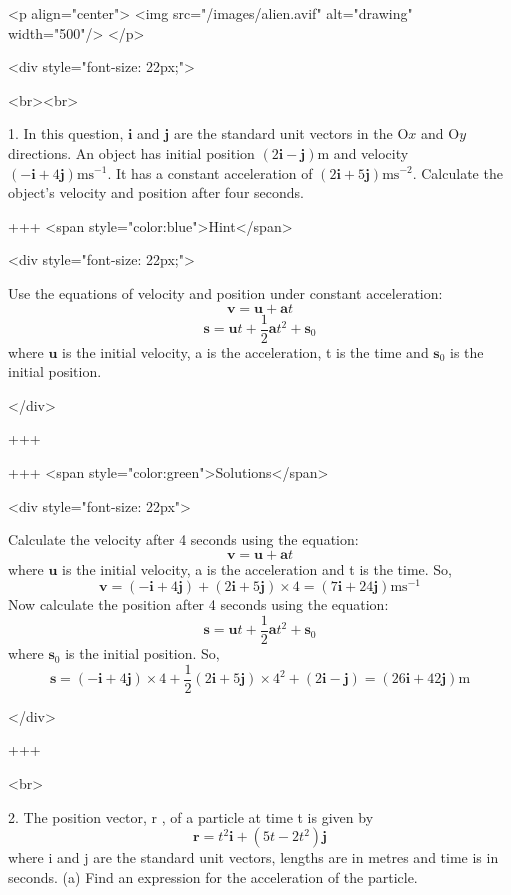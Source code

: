 <p align="center">
<img src="/images/alien.avif" alt="drawing" width="500"/>
</p>

<div style="font-size: 22px;">

<br><br>

1. In this question, $\mathbf{i}$ and $\mathbf{j}$ are the standard unit vectors in the $\mathrm{O} x$ and $\mathrm{O} y$ directions. An object has initial position $(2 \mathbf{i}-\mathbf{j}) \mathrm{m}$ and velocity $(-\mathbf{i}+4 \mathbf{j}) \mathrm{ms}^{-1}$. It has a constant acceleration of $(2 \mathbf{i}+5 \mathbf{j}) \mathrm{ms}^{-2}$.
Calculate the object's velocity and position after four seconds.

+++ <span style="color:blue">Hint</span>

<div style="font-size: 22px;">

Use the equations of velocity and position under constant acceleration:
$$\mathbf{v}=\mathbf{u}+\mathbf{a} t$$
$$\mathbf{s}=\mathbf{u} t+\frac{1}{2} \mathbf{a} t^{2}+\mathbf{s}_{0}$$
where $\mathbf{u}$ is the initial velocity, a is the acceleration, t is the time and $\mathbf{s}_{0}$ is the initial position.

</div>

+++

+++ <span style="color:green">Solutions</span>

<div style="font-size: 22px">

Calculate the velocity after 4 seconds using the equation:
$$\mathbf{v}=\mathbf{u}+\mathbf{a} t$$
where $\mathbf{u}$ is the initial velocity, a is the acceleration and t is the time.
So,
\[\mathbf{v}=(-\mathbf{i}+4 \mathbf{j})+(2 \mathbf{i}+5 \mathbf{j}) \times 4=(7 \mathbf{i}+24 \mathbf{j}) \mathrm{ms}^{-1}\]
Now calculate the position after 4 seconds using the equation:
$$\mathbf{s}=\mathbf{u} t+\frac{1}{2} \mathbf{a} t^{2}+\mathbf{s}_{0}$$
where $\mathbf{s}_{0}$ is the initial position.
So,
\[\mathbf{s}=(-\mathbf{i}+4 \mathbf{j}) \times 4+\frac{1}{2}(2 \mathbf{i}+5 \mathbf{j}) \times 4^{2}+(2 \mathbf{i}-\mathbf{j})=(26 \mathbf{i}+42 \mathbf{j}) \mathrm{m}\]


</div>

+++

<br>


2. The position vector, r , of a particle at time t is given by
$$
\mathbf{r}=t^{2} \mathbf{i}+\left(5 t-2 t^{2}\right) \mathbf{j}
$$
where i and j are the standard unit vectors, lengths are in metres and time is in seconds.
(a) Find an expression for the acceleration of the particle.

